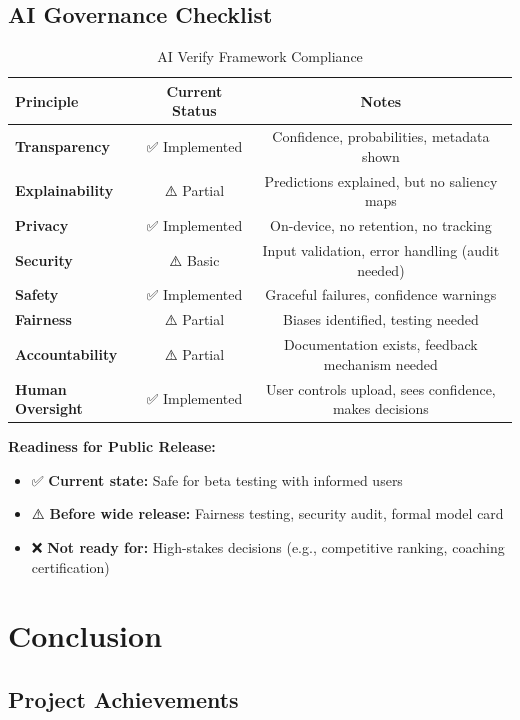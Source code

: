 \documentclass[11pt,a4paper]{article}
\begin{document}
\subsection{AI Governance Checklist}

\begin{table}[H]
\centering
\caption{AI Verify Framework Compliance}
\small
\begin{tabular}{lcc}
\toprule
Principle & Current Status & Notes \\
\midrule
\textbf{Transparency} & ✅ Implemented & Confidence, probabilities, metadata shown \\
\textbf{Explainability} & ⚠️ Partial & Predictions explained, but no saliency maps \\
\textbf{Privacy} & ✅ Implemented & On-device, no retention, no tracking \\
\textbf{Security} & ⚠️ Basic & Input validation, error handling (audit needed) \\
\textbf{Safety} & ✅ Implemented & Graceful failures, confidence warnings \\
\textbf{Fairness} & ⚠️ Partial & Biases identified, testing needed \\
\textbf{Accountability} & ⚠️ Partial & Documentation exists, feedback mechanism needed \\
\textbf{Human Oversight} & ✅ Implemented & User controls upload, sees confidence, makes decisions \\
\bottomrule
\end{tabular}
\end{table}

\textbf{Readiness for Public Release:}

\begin{itemize}
\item ✅ \textbf{Current state:} Safe for beta testing with informed users
\item ⚠️ \textbf{Before wide release:} Fairness testing, security audit, formal model card
\item ❌ \textbf{Not ready for:} High-stakes decisions (e.g., competitive ranking, coaching certification)
\end{itemize}

\section{Conclusion}

\subsection{Project Achievements}
\end{document}
